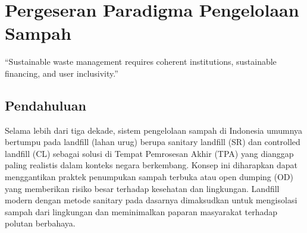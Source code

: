 \documentclass[
  letterpaper,
  DIV=11,
  numbers=noendperiod]{scrreprt}
\begin{document}
\chapter{Pergeseran Paradigma Pengelolaan
Sampah}\label{pergeseran-paradigma-pengelolaan-sampah}

``Sustainable waste management requires coherent institutions,
sustainable financing, and user inclusivity.''

\section{Pendahuluan}\label{pendahuluan}

Selama lebih dari tiga dekade, sistem pengelolaan sampah di Indonesia
umumnya bertumpu pada landfill (lahan urug) berupa sanitary landfill
(SR) dan controlled landfill (CL) sebagai solusi di Tempat Pemrosesan
Akhir (TPA) yang dianggap paling realistis dalam konteks negara
berkembang. Konsep ini diharapkan dapat menggantikan praktek penumpukan
sampah terbuka atau open dumping (OD) yang memberikan risiko besar
terhadap kesehatan dan lingkungan. Landfill modern dengan metode
sanitary pada dasarnya dimaksudkan untuk mengisolasi sampah dari
lingkungan dan meminimalkan paparan masyarakat terhadap polutan
berbahaya.
\end{document}
